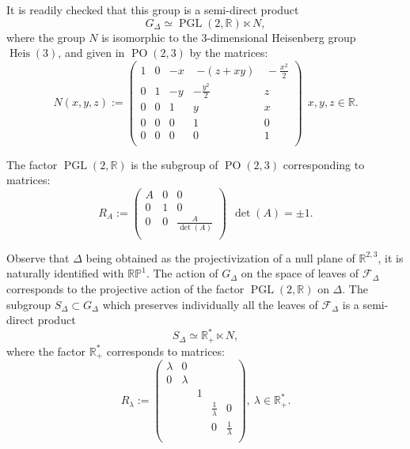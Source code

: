 \documentclass[11pt]{article}
\theoremstyle{definition}
\numberwithin{equation}{section}
\numberwithin{figure}{section}
\numberwithin{table}{section}
\DeclareMathOperator{\PGL}{PGL}
\DeclareMathOperator{\Heis}{Heis}
\newcommand{\calfd}{{{\mathcal{F}}}_{\Delta}}
\newcommand*\RR{\mathbb{R}}
\DeclareMathOperator{\POop}{PO}
\newcommand{\PO}{{\POop(2,3)}}
\begin{document}
It is readily checked that this group is a semi-direct product
\[
G_{\Delta} \simeq \PGL(2,\RR) \ltimes N,
\]
where the group $N$ is isomorphic to the $3$-dimensional
Heisenberg group $\Heis(3)$, and given in $\PO$ by the matrices:
\begin{equation}\label{eq.formule.heisenberg}
N(x,y,z):=
\begin{pmatrix}
1&0&-x&\, \, {-(z+xy)}&\, -\frac{x^2}{2}\\
0&1&-y&-\frac{y^2}{2}&z\\
0&0&1&y&x\\
0&0&0&1&0\\
0&0&0&0&1\\
\end{pmatrix} \ \ x,y,z \in \RR.
\end{equation}

The factor $\PGL(2,\RR)$ is the subgroup of $\PO$ corresponding to matrices:
\begin{equation}
R_A:= \label{eq.formule.pgl2}
\begin{pmatrix}
A &0&0\\
0&1&0\\
0&0&\frac{A}{\operatorname{det}(A)}\\
\end{pmatrix}  \ \ \det(A)=\pm 1.
\end{equation}

Observe that $\Delta$ being obtained as the projectivization of a null plane of $\RR^{2,3}$, it is naturally identified with ${\mathbb{RP}^1}$. The action of $G_{\Delta}$ on the space of leaves of $\calfd$ corresponds to the projective action of the factor $\PGL(2,\RR)$ on $\Delta$. The subgroup $S_{\Delta} \subset G_{\Delta}$ which preserves individually all the leaves of $\calfd$ is a semi-direct product
\[
S_{\Delta} \simeq \RR_+^* \ltimes N,
\]
where the factor $\RR_+^*$ corresponds to matrices:
\begin{equation}
R_{\lambda}:= \label{eq.facteurR}
\begin{pmatrix}
\lambda&0& & & \\
0& \lambda & & & \\
& & 1 & & \\
& & & \frac{1}{\lambda}&0\\
& & & 0& \frac{1}{\lambda}\\
\end{pmatrix}, \ \lambda \in \RR_+^*.
\end{equation}
\end{document}
